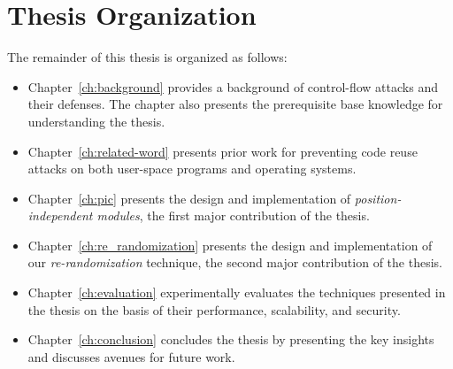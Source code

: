 \section{Thesis Organization}
The remainder of this thesis is organized as follows:
\begin{itemize}
    \item Chapter~\ref{ch:background} provides a background of control-flow attacks and their defenses. The chapter also presents the prerequisite base knowledge for understanding the thesis.
    \item Chapter~\ref{ch:related-word} presents prior work for preventing code reuse attacks on both user-space programs and operating systems.
    \item Chapter~\ref{ch:pic} presents the design and implementation of \textit{position-independent modules}, the first major contribution of the thesis. 
    \item Chapter~\ref{ch:re_randomization} presents the design and implementation of our \textit{re-randomization} technique, the second major contribution of the thesis.
    \item Chapter~\ref{ch:evaluation} experimentally evaluates the techniques presented in the thesis on the basis of their performance, scalability, and security.
    \item Chapter~\ref{ch:conclusion} concludes the thesis by presenting the key insights and discusses avenues for future work.
\end{itemize}